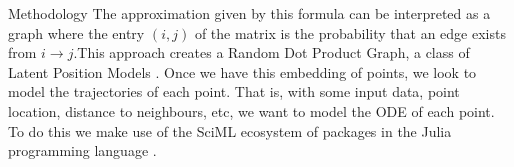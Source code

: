 \documentclass[12pt]{amsart}
\begin{document}
\begin{section}{Methodology}
    The approximation  given by this formula can be interpreted as a graph where the entry $(i,j)$ of the matrix is the probability that an edge exists from $i \rightarrow j$.This approach creates a Random Dot Product Graph\cite{athreya2017statistical}, a class of Latent Position Models \cite{hoff2002latent}. Once we have this embedding of points, we look to model the trajectories of each point. That is, with some input data, point location, distance to neighbours, etc, we want to model the ODE of each point. To do this we make use of the SciML ecosystem of packages in the Julia programming language \cite{SciML_C_Rak}.\\



     
    

\end{section}
\end{document}
